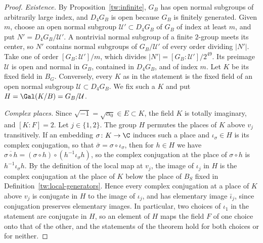 \begin{proof}
\emph{Existence.} By Proposition~\ref{tw:infinite}, $G_B$ has open normal
subgroups of arbitrarily large index, and $D_4G_B$ is open because $G_B$ is
finitely generated. Given $m$, choose an open normal subgroup
$\mathcal U'\subset D_4G_B$ of $G_B$ of index at least $m$, and put
$N'=D_4G_B/\mathcal U'$. A nontrivial normal subgroup of a finite $2$-group
meets its center, so $N'$ contains normal subgroups of $G_B/\mathcal U'$ of
every order dividing $|N'|$. Take one of order $[G_B:\mathcal U']/m$, which
divides $|N'|=[G_B:\mathcal U']/2^{49}$. Its preimage $\mathcal U$ is open and
normal in $G_B$, contained in $D_4G_B$, and of index $m$. Let $K$ be its fixed
field in $B_G$. Conversely, every $K$ as in the statement is the fixed field
of an open normal subgroup $\mathcal U\subset D_4G_B$. We fix such a $K$ and put
$H=\Gal(K/B)=G_B/\mathcal U$.

\emph{Complex places.} Since $\sqrt{-1}=\sqrt{\alpha_0}\in E\subset K$, the
field $K$ is totally imaginary, and $[K:F]=2$. Let $j\in\{1,2\}$. The group
$H$ permutes the places of $K$ above $v_j$ transitively. If an embedding
$\sigma\colon K\to\C$ induces such a place and $\iota_\sigma\in H$ is its
complex conjugation, so that $\bar\sigma=\sigma\circ\iota_\sigma$, then for
$h\in H$ we have
$\overline{\sigma\circ h}=(\sigma\circ h)\circ(h^{-1}\iota_\sigma h)$, so the
complex conjugation at the place of $\sigma\circ h$ is
$h^{-1}\iota_\sigma h$. By the definition of
the local map at $v_j$, the image of $\iota_j$ in $H$ is the complex
conjugation at the place of $K$ below the place of $B_S$ fixed in
Definition~\ref{tw:local-generators}. Hence every complex conjugation at a
place of $K$ above $v_j$ is conjugate in $H$ to the image of $\iota_j$, and
has elementary image $\bar\iota_j$, since conjugation preserves elementary
images. In particular, two choices of $\iota_1$ in the statement are
conjugate in $H$, so an element of $H$ maps the field $F$ of one choice onto
that of the other, and the statements of the theorem hold for both choices
or for neither.


\end{proof}
